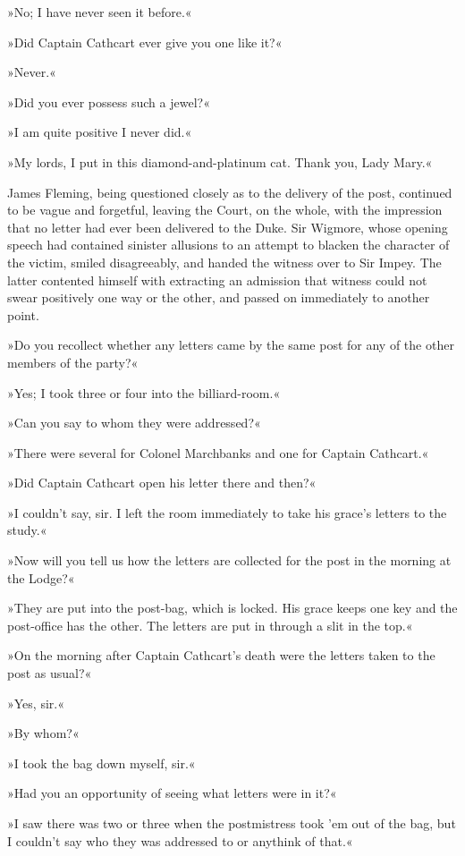 »No; I have never seen it before.«

»Did Captain Cathcart ever give you one like it?«

»Never.«

»Did you ever possess such a jewel?«

»I am quite positive I never did.«

»My lords, I put in this diamond-and-platinum cat. Thank you, Lady Mary.«

James Fleming, being questioned closely as to the delivery of the post, continued to be vague and forgetful, leaving the Court, on the whole, with the impression that no letter had ever been delivered to the Duke.  Sir Wigmore, whose opening speech had contained sinister allusions to an attempt to blacken the character of the victim, smiled disagreeably, and handed the witness over to Sir Impey. The latter contented himself with extracting an admission that witness could not swear positively one way or the other, and passed on immediately to another point.

»Do you recollect whether any letters came by the same post for any of the other members of the party?«

»Yes; I took three or four into the billiard-room.«

»Can you say to whom they were addressed?«

»There were several for Colonel Marchbanks and one for Captain Cathcart.«

»Did Captain Cathcart open his letter there and then?«

»I couldn't say, sir. I left the room immediately to take his grace's letters to the study.«

»Now will you tell us how the letters are collected for the post in the morning at the Lodge?«

»They are put into the post-bag, which is locked. His grace keeps one key and the post-office has the other. The letters are put in through a slit in the top.«

»On the morning after Captain Cathcart's death were the letters taken to the post as usual?«

»Yes, sir.«

»By whom?«

»I took the bag down myself, sir.«

»Had you an opportunity of seeing what letters were in it?«

»I saw there was two or three when the postmistress took 'em out of the bag, but I couldn't say who they was addressed to or anythink of that.«

